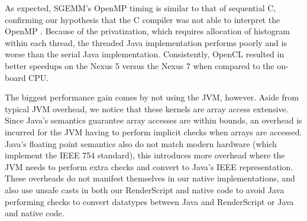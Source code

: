 As expected, SGEMM's OpenMP timing is similar to that of sequential C, confirming our hypothesis that the C compiler was not able
  to interpret the OpenMP .
Because of the privatization, which requires allocation of histogram within each thread, the threaded Java implementation performs poorly and is 
  worse than the serial Java implementation.
Consistently, OpenCL resulted in better speedups on the Nexus 5 versus the Nexus 7 when compared to the on-board CPU. 

The biggest performance gain comes by not using the JVM, however.
Aside from typical JVM overhead, we notice that these kernels are array access extensive.
Since Java's semantics guarantee array accesses are within bounds, an overhead is incurred for the JVM having to perform implicit checks when arrays are accessed.
Java's floating point semantics also do not match modern hardware (which implement the IEEE 754 standard),
  this introduces more overhead where the JVM needs to perform extra checks and
  convert to Java's IEEE representation.
These overheads do not manifest themselves in our native implementations, and
  also use unsafe casts in both our RenderScript and native code
  to avoid Java performing checks to convert datatypes between Java and RenderScript or Java and native code.

